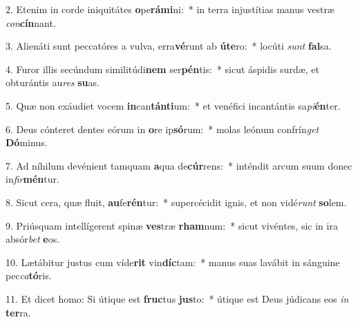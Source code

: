 2. Etenim in corde iniquitátes \textbf{o}pe\textbf{rá}\textbf{mi}ni:~*  in terra injustítias manus vestræ \textit{con}\textbf{cín}nant.\

3. Alienáti sunt peccatóres a vulva, erra\textbf{vé}runt ab \textbf{ú}\textbf{te}ro:~*  locúti \textit{sunt} \textbf{fal}sa.\

4. Furor illis secúndum similitúdi\textbf{nem} ser\textbf{pén}tis:~*  sicut áspidis surdæ, et obturántis au\textit{res} \textbf{su}as.\

5. Quæ non exáudiet vocem \textbf{in}can\textbf{tán}\textbf{ti}um:~*  et venéfici incantántis sa\textit{pi}\textbf{én}ter.\

6. Deus cónteret dentes eórum in \textbf{o}re ip\textbf{só}rum:~*  molas leónum confrín\textit{get} \textbf{Dó}minus.\

7. Ad níhilum devénient tamquam \textbf{a}qua de\textbf{cúr}rens:~*  inténdit arcum suum donec in\textit{fir}\textbf{mén}tur.\

8. Sicut cera, quæ fluit, \textbf{au}fe\textbf{rén}tur:~*  supercécidit ignis, et non vidé\textit{runt} \textbf{so}lem.\

9. Priúsquam intellígerent spinæ \textbf{ves}træ \textbf{rham}num:~*  sicut vivéntes, sic in ira absór\textit{bet} \textbf{e}os.\

10. Lætábitur justus cum víde\textbf{rit} vin\textbf{díc}tam:~*  manus suas lavábit in sánguine pec\textit{ca}\textbf{tó}ris.\

11. Et dicet homo: Si útique est \textbf{fruc}tus \textbf{jus}to:~*  útique est Deus júdicans eos \textit{in} \textbf{ter}ra.\


